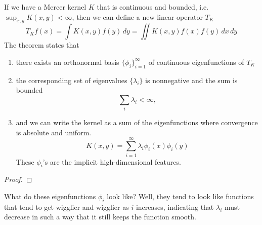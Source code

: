   \begin{theorem}
    \label{thm:mercers-theorem}
    If we have a Mercer kernel $K$ that is continuous and bounded, i.e. $\sup_{x, y} K(x, y) < \infty$, then we can define a new linear operator $T_K$ 
    \begin{equation}
      T_K f(x) =  \int K(x, y) f(y) \,dy = \iint K(x, y) f(x) f(y) \,dx\,dy
    \end{equation}
    The theorem states that 
    \begin{enumerate}
      \item there exists an orthonormal basis $\{\phi_i\}_{i=1}^\infty$ of continuous eigenfunctions of $T_K$ 
      \item the corresponding set of eigenvalues $\{\lambda_i\}$ is nonnegative and the sum is bounded 
      \begin{equation}
        \sum_i \lambda_i < \infty, 
      \end{equation}
      \item and we can write the kernel as a sum of the eigenfunctions where convergence is absolute and uniform. 
      \begin{equation}
        K(x, y) = \sum_{i=1}^\infty \lambda_i \phi_i(x) \phi_i(y)
      \end{equation}
      These $\phi_i$'s are the implicit high-dimensional features. 
    \end{enumerate}
  \end{theorem}
  \begin{proof}
    
  \end{proof}

  What do these eigenfunctions $\phi_i$ look like? Well, they tend to look like functions that tend to get wigglier and wigglier as $i$ increases, indicating that $\lambda_i$ must decrease in such a way that it still keeps the function smooth. 

